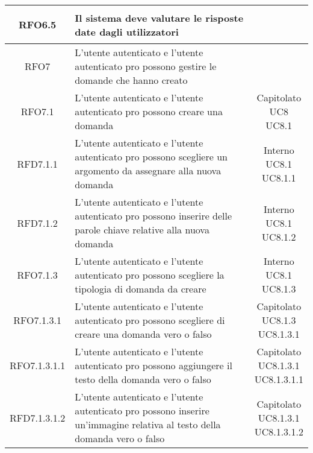 \begin{longtable}{|c|>{\centering}m{7cm}|c|}
			 \hypertarget{{RFO6.5}}{{RFO6.5}} & Il sistema deve valutare le risposte date dagli utilizzatori & \makecell{Capitolato } \\ \hline
			 \hypertarget{{RFO7}}{{RFO7}} & L’utente autenticato e l’utente autenticato pro possono gestire le domande che hanno creato & \makecell{Capitolato } \\ \hline
			 \hypertarget{{RFO7.1}}{{RFO7.1}} & L’utente autenticato e l’utente autenticato pro possono creare una domanda  & \makecell{Capitolato\\ UC8 \\UC8.1 } \\ \hline
			 \hypertarget{{RFD7.1.1}}{{RFD7.1.1}} & L’utente autenticato e l’utente autenticato pro possono scegliere un argomento da assegnare alla nuova domanda  & \makecell{Interno\\ UC8.1 \\UC8.1.1 } \\ \hline
			 \hypertarget{{RFD7.1.2}}{{RFD7.1.2}} & L’utente autenticato e l’utente autenticato pro possono inserire delle parole chiave relative alla nuova domanda & \makecell{Interno\\ UC8.1 \\UC8.1.2 } \\ \hline
			 \hypertarget{{RFO7.1.3}}{{RFO7.1.3}} & L’utente autenticato e l’utente autenticato pro possono scegliere la tipologia  di domanda da creare  & \makecell{Interno\\ UC8.1 \\UC8.1.3 } \\ \hline
			 \hypertarget{{RFO7.1.3.1}}{{RFO7.1.3.1}} & L’utente autenticato e l’utente autenticato pro possono scegliere di creare una domanda vero o falso & \makecell{Capitolato\\ UC8.1.3 \\UC8.1.3.1 } \\ \hline
			 \hypertarget{{RFO7.1.3.1.1}}{{RFO7.1.3.1.1}} & L’utente autenticato e l'utente autenticato pro possono aggiungere il testo della domanda vero o falso & \makecell{Capitolato\\ UC8.1.3.1 \\UC8.1.3.1.1 } \\ \hline
			 \hypertarget{{RFD7.1.3.1.2}}{{RFD7.1.3.1.2}} & L’utente autenticato e l'utente autenticato pro possono inserire un'immagine relativa al testo della domanda vero o falso & \makecell{Capitolato\\ UC8.1.3.1 \\UC8.1.3.1.2 } \\ \hline

\end{longtable}
